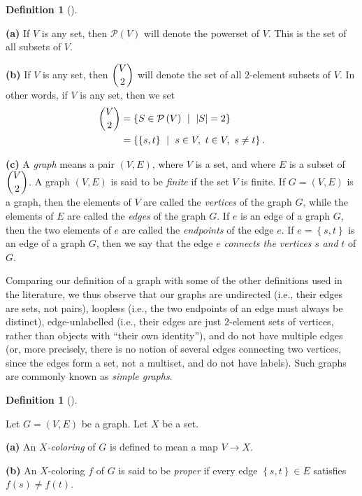 \documentclass[numbers=enddot,12pt,final,onecolumn,notitlepage]{scrartcl}%
\theoremstyle{definition}
\newtheorem{defi}[theo]{Definition}
\newenvironment{definition}[1][]
{\begin{defi}[#1]\begin{leftbar}}
{\end{leftbar}\end{defi}}
\begin{document}
\begin{definition}
\label{def.graph}\textbf{(a)} If $V$ is any set, then $\mathcal{P}\left(
V\right)  $ will denote the powerset of $V$. This is the set of all subsets of
$V$.

\textbf{(b)} If $V$ is any set, then $\dbinom{V}{2}$ will denote the set of
all $2$-element subsets of $V$. In other words, if $V$ is any set, then we set%
\begin{align*}
\dbinom{V}{2}  &  =\left\{  S\in\mathcal{P}\left(  V\right)  \ \mid
\ \left\vert S\right\vert =2\right\} \\
&  =\left\{  \left\{  s,t\right\}  \ \mid\ s\in V,\ t\in V,\ s\neq t\right\}
.
\end{align*}


\textbf{(c)} A \emph{graph} means a pair $\left(  V,E\right)  $, where $V$ is
a set, and where $E$ is a subset of $\dbinom{V}{2}$. A graph $\left(
V,E\right)  $ is said to be \emph{finite} if the set $V$ is finite. If
$G=\left(  V,E\right)  $ is a graph, then the elements of $V$ are called the
\emph{vertices} of the graph $G$, while the elements of $E$ are called the
\emph{edges} of the graph $G$. If $e$ is an edge of a graph $G$, then the two
elements of $e$ are called the \emph{endpoints} of the edge $e$. If
$e=\left\{  s,t\right\}  $ is an edge of a graph $G$, then we say that the
edge $e$ \emph{connects the vertices }$s$ \emph{and }$t$ of $G$.
\end{definition}

Comparing our definition of a graph with some of the other definitions used in
the literature, we thus observe that our graphs are undirected (i.e., their
edges are sets, not pairs), loopless (i.e., the two endpoints of an edge must
always be distinct), edge-unlabelled (i.e., their edges are just $2$-element
sets of vertices, rather than objects with \textquotedblleft their own
identity\textquotedblright), and do not have multiple edges (or, more
precisely, there is no notion of several edges connecting two vertices, since
the edges form a set, not a multiset, and do not have labels). Such graphs are
commonly known as \emph{simple graphs}.

\begin{definition}
\label{def.coloring}Let $G=\left(  V,E\right)  $ be a graph. Let $X$ be a set.

\textbf{(a)} An $X$\emph{-coloring} of $G$ is defined to mean a map
$V\rightarrow X$.

\textbf{(b)} An $X$-coloring $f$ of $G$ is said to be \emph{proper} if every
edge $\left\{  s,t\right\}  \in E$ satisfies $f\left(  s\right)  \neq f\left(
t\right)  $.
\end{definition}
\end{document}
